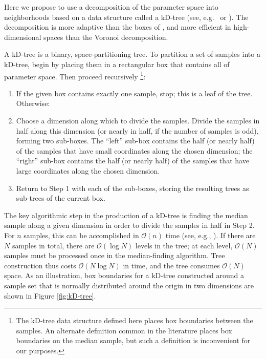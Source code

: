 \documentclass{iopart}
\newcommand{\order}[1]{\mathcal{O}\left( #1 \right)}
\begin{document}
Here we propose to use a decomposition of the parameter space into
neighborhoods based on a data structure called a kD-tree (see,
e.g.\ \cite{Berg2008} or \cite{Gaede1998}).  The decomposition is more
adaptive than the boxes of \cite{Littenberg2009}, and more
efficient in high-dimensional spaces than the Voronoi decomposition.

A kD-tree is a binary, space-partitioning tree.  To partition a set of
samples into a kD-tree, begin by placing them in a rectangular box that
contains all of parameter space.  Then proceed recursively%
\footnote{The kD-tree data structure defined here places box boundaries
  between the samples.  An alternate definition common in the
  literature places box boundaries on the median sample, but such a
  definition is inconvenient for our purposes.}: %
\begin{enumerate}
\item If the given box contains exactly one sample, stop; this is a
  leaf of the tree.  Otherwise:
\item Choose a dimension along which to divide the samples.  Divide the
  samples in half along this dimension (or nearly in half, if the
  number of samples is odd), forming two sub-boxes.  The ``left''
  sub-box contains the half (or nearly half) of the samples that have
  small coordinates along the chosen dimension; the ``right'' sub-box
  contains the half (or nearly half) of the samples that have large
  coordinates along the chosen dimension.
\item Return to Step 1 with each of the sub-boxes, storing the
  resulting trees as sub-trees of the current box.
\end{enumerate}
The key algorithmic step in the production of a kD-tree is finding the
median sample along a given dimension in order to divide the samples in
half in Step 2.  For $n$ samples, this can be accomplished in
$\order{n}$ time (see, e.g., \cite{Press2007}).  If there are $N$
samples in total, there are $\order{\log N}$ levels in the tree; at
each level, $\order{N}$ samples must be processed once in the
median-finding algorithm.  Tree construction thus costs $\order{N \log
  N}$ in time, and the tree consumes $\order{N}$ space.  As an
illustration, box boundaries for a kD-tree constructed around a sample
set that is normally distributed around the origin in two dimensions
are shown in Figure \ref{fig:kD-tree}.
\end{document}
